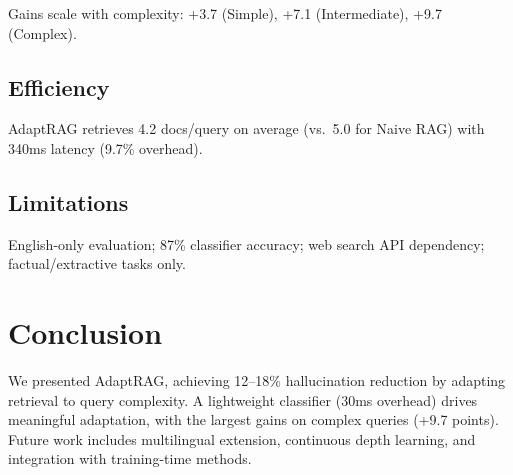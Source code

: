 \documentclass[11pt]{article}
\begin{document}
Gains scale with complexity: +3.7 (Simple), +7.1 (Intermediate), +9.7 (Complex).

\subsection{Efficiency}
AdaptRAG retrieves 4.2 docs/query on average (vs.\ 5.0 for Naive RAG) with 340ms latency (9.7\% overhead).

\subsection{Limitations}
English-only evaluation; 87\% classifier accuracy; web search API dependency; factual/extractive tasks only.

\section{Conclusion}

We presented AdaptRAG, achieving 12--18\% hallucination reduction by adapting retrieval to query complexity. A lightweight classifier (30ms overhead) drives meaningful adaptation, with the largest gains on complex queries (+9.7 points). Future work includes multilingual extension, continuous depth learning, and integration with training-time methods.


\end{document}

